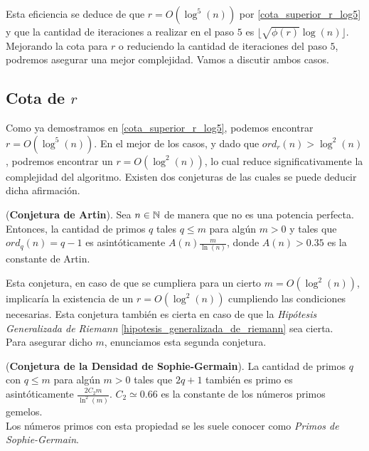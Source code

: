 Esta eficiencia se deduce de que $r = O(\log^5(n))$ por \autoref{cota_superior_r_log5} y que la cantidad de iteraciones a realizar en el paso $5$ es $\lfloor \sqrt{\phi(r)}\log(n) \rfloor$.\\

Mejorando la cota para $r$ o reduciendo la cantidad de iteraciones del paso $5$, podremos asegurar una mejor complejidad. Vamos a discutir ambos casos.

\subsection{Cota de $r$}

Como ya demostramos en \autoref{cota_superior_r_log5}, podemos encontrar $r = O(\log^5(n))$. En el mejor de los casos, y dado que $ord_r(n) > \log^2(n)$, podremos encontrar un $r = O(\log^2(n))$, lo cual reduce significativamente la complejidad del algoritmo. Existen dos conjeturas de las cuales se puede deducir dicha afirmación.

\begin{conjetura}{(\textbf{Conjetura de Artin}).}\label{conjetura_de_artin}
	Sea $n \in \mathbb{N}$ de manera que no es una potencia perfecta. Entonces, la cantidad de primos $q$ tales $q \leq m$ para algún $m > 0$ y tales que $ord_q(n) = q-1$ es asintóticamente $A(n)\frac{m}{\ln(n)}$, donde $A(n) > 0.35$ es la constante de Artin.
\end{conjetura}

Esta conjetura, en caso de que se cumpliera para un cierto $m = O(\log^2(n))$, implicaría la existencia de un $r = O(\log^2(n))$ cumpliendo las condiciones necesarias. Esta conjetura también es cierta en caso de que la \textit{Hipótesis Generalizada de Riemann} \ref{hipotesis_generalizada_de_riemann} sea cierta.\\

Para asegurar dicho $m$, enunciamos esta segunda conjetura.

\begin{conjetura}{(\textbf{Conjetura de la Densidad de Sophie-Germain}).}\label{conjetura_de_sophie_germain}
	La cantidad de primos $q$ con $q \leq m$ para algún $m > 0$ tales que $2q + 1$ también es primo es asintóticamente $\frac{2C_2m}{\ln^2(m)}$. $C_2 \simeq 0.66$ es la constante de los números primos gemelos.\\
	
	Los números primos con esta propiedad se les suele conocer como \textit{Primos de Sophie-Germain}.
\end{conjetura}

